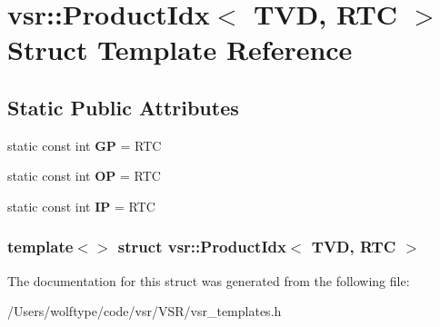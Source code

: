 \hypertarget{structvsr_1_1_product_idx_3_01_t_v_d_00_01_r_t_c_01_4}{\section{vsr\-:\-:Product\-Idx$<$ T\-V\-D, R\-T\-C $>$ Struct Template Reference}
\label{structvsr_1_1_product_idx_3_01_t_v_d_00_01_r_t_c_01_4}
}
\subsection*{Static Public Attributes}
\begin{DoxyCompactItemize}
\item 
\hypertarget{structvsr_1_1_product_idx_3_01_t_v_d_00_01_r_t_c_01_4_afbab194f6de940588a37df12d43ecd1b}{static const int {\bfseries G\-P} = R\-T\-C}\label{structvsr_1_1_product_idx_3_01_t_v_d_00_01_r_t_c_01_4_afbab194f6de940588a37df12d43ecd1b}

\item 
\hypertarget{structvsr_1_1_product_idx_3_01_t_v_d_00_01_r_t_c_01_4_a97c0d6e758612eb648e2af7a23821a4e}{static const int {\bfseries O\-P} = R\-T\-C}\label{structvsr_1_1_product_idx_3_01_t_v_d_00_01_r_t_c_01_4_a97c0d6e758612eb648e2af7a23821a4e}

\item 
\hypertarget{structvsr_1_1_product_idx_3_01_t_v_d_00_01_r_t_c_01_4_a6653fce72c50cab489dab913d471df20}{static const int {\bfseries I\-P} = R\-T\-C}\label{structvsr_1_1_product_idx_3_01_t_v_d_00_01_r_t_c_01_4_a6653fce72c50cab489dab913d471df20}

\end{DoxyCompactItemize}
\subsubsection*{template$<$$>$ struct vsr\-::\-Product\-Idx$<$ T\-V\-D, R\-T\-C $>$}



The documentation for this struct was generated from the following file\-:\begin{DoxyCompactItemize}
\item 
/\-Users/wolftype/code/vsr/\-V\-S\-R/vsr\-\_\-templates.\-h\end{DoxyCompactItemize}
